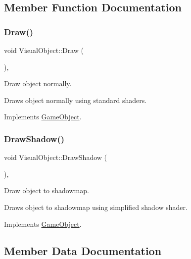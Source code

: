 \subsection{Member Function Documentation}
\mbox{\label{class_visual_object_a10c0e01e375fd4af08e57f3475dd312c}} 
\subsubsection{\texorpdfstring{Draw()}{Draw()}}
{\footnotesize\ttfamily void Visual\+Object\+::\+Draw (\begin{DoxyParamCaption}{ }\end{DoxyParamCaption})\hspace{0.3cm}{\ttfamily [override]}, {\ttfamily [virtual]}}



Draw object normally. 

Draws object normally using standard shaders. 

Implements \mbox{\hyperlink{class_game_object_a29a665f46fda87982825bc5c0ca6a888}{Game\+Object}}.

\mbox{\label{class_visual_object_a88e778dc97ad93cefd5193d6899d6c82}} 
\subsubsection{\texorpdfstring{DrawShadow()}{DrawShadow()}}
{\footnotesize\ttfamily void Visual\+Object\+::\+Draw\+Shadow (\begin{DoxyParamCaption}{ }\end{DoxyParamCaption})\hspace{0.3cm}{\ttfamily [override]}, {\ttfamily [virtual]}}



Draw object to shadowmap. 

Draws object to shadowmap using simplified shadow shader. 

Implements \mbox{\hyperlink{class_game_object_a78bf45c8ef3805247435583556087788}{Game\+Object}}.



\subsection{Member Data Documentation}
\mbox{\label{class_visual_object_a325fec77ff1a5441f1ff4ffa98e508c8}} 

